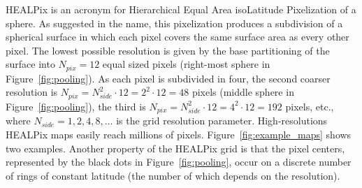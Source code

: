 \documentclass[final,twocolumn,3p,times,authoryear]{elsarticle}
\newcommand{\nati}[1]{{\color[rgb]{.1,.6,.1}{#1}}}
\newcommand{\figref}[1]{Figure~\ref{fig:#1}}
\newcommand{\1}{\b{1}}              %
\newcommand{\0}{\b{0}}              %
\begin{document}
HEALPix is an acronym for Hierarchical Equal Area isoLatitude Pixelization of a sphere. As suggested in the name, this pixelization produces a subdivision of a spherical surface in which each pixel covers the same surface area as every other pixel.
The lowest possible resolution is given by the base partitioning of the surface into $N_{pix} = 12$ equal sized pixels (right-most sphere in \figref{pooling}). As each pixel is subdivided in four, the second coarser resolution is $N_{pix} = N_{side}^2 \cdot 12 = 2^2 \cdot 12 = 48$ pixels (middle sphere in \figref{pooling}), the third is $N_{pix} = N_{side}^2 \cdot 12 = 4^2 \cdot 12 = 192$ pixels, etc., where $N_{side} = 1, 2, 4, 8, \ldots$ is the grid resolution parameter.
High-resolutions HEALPix maps easily reach millions of pixels. \figref{example_maps} shows two examples.
Another property of the HEALPix grid is that the pixel centers, represented by the black dots in \figref{pooling}, occur on a discrete number of rings of constant latitude (the number of which depends on the resolution).
\nati{The figure is beautiful, but should we really show it? If we target cosmologists, we can simply list some type of data. If we target a broader audience, maybe it makes sense to provide some illustration.}
\end{document}

